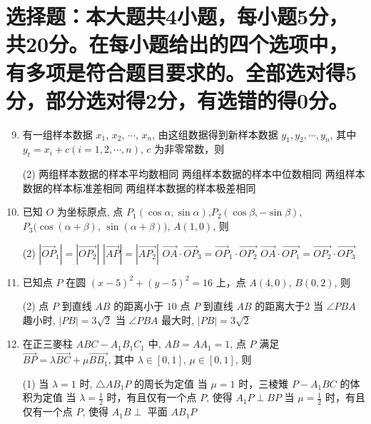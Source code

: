 \documentclass[11pt,space]{ctexart} %
\begin{document}
\begin{enumerate}[itemsep=0.3em,topsep=0pt]
\end{enumerate}

\section{选择题：本大题共4小题，每小题5分，共20分。在每小题给出的四个选项中，有多项是符合题目要求的。全部选对得5分，部分选对得2分，有选错的得0分。}


\begin{enumerate}[itemsep=0.3em,topsep=0pt]
	\setcounter{enumi}{8}

	\item    有一组样本数据 $ x_{1}$, $x_{2}$, $\cdots$, $x_{n} $, 由这组数据得到新样本数据  $y_{1}, y_{2}, \cdots, y_{n} $, 其中
	$y_{t}=x_{i}+c(i=1,2, \cdots, n)$, $c $ 为非零常数，则
	\begin{tasks}(2)
	\task  两组样本数据的样本平均数相同
	\task 两组样本数据的样本中位数相同
	\task 两组样本数据的样本标准差相同
	\task 两组样本数据的样本极差相同
	\end{tasks}

\newpage
   \item    已知 $ O $ 为坐标原点, 点 $ P_{1}(\cos \alpha, \sin \alpha)$,$ P_{2}(\cos \beta,-\sin \beta)$, $P_{3}(\cos (\alpha+\beta)$, $\sin (\alpha+\beta)) $,
	$A(1,0) $, 则

	\begin{tasks}(2)
	\task $ \left|\overrightarrow{O P}_{1}\right|=\left|\overrightarrow{O P_{2}}\right| $ \task $ |\overrightarrow{A P}|=\left|\overrightarrow{A P_{2}}\right| $
	\task $\overrightarrow{O A} \cdot \overrightarrow{O P}_{3}=\overrightarrow{O P}_{1} \cdot \overrightarrow{O P_{2}}  $
	\task $\overrightarrow{O A} \cdot \overrightarrow{O P_{1}}=\overrightarrow{O P_{2}} \cdot \overrightarrow{O P_{3}} $
	\end{tasks}

   \item    已知点 $ P $ 在圆 $ (x-5)^{2}+(y-5)^{2}=16 $ 上，点 $ A(4,0)$, $ B(0,2) $, 则
   \begin{tasks}(2)
   \task 点 $ P$  到直线  $A B $ 的距离小于 $10$
   \task 点 $ P $ 到直线 $ A B $ 的距离大于$2$
   \task 当 $ \angle P B A $ 趣小时, $ |P B|=3 \sqrt{2}$
   \task 当  $\angle P B A $ 最大时, $ |P B|=3 \sqrt{2}$
   \end{tasks}

   \item    在正三麥柱 $ A B C-A_{1} B_{1} C_{1} $ 中, $ A B=A A_{1}=1 $, 点 $ P $ 满足  $\overrightarrow{B P}=\lambda \overrightarrow{B C}+\mu \overrightarrow{B B_{1}} $, 其中
	$\lambda \in[0,1]$, $ \mu \in[0,1]$,   则

\begin{tasks}(1)
\task 当 $ \lambda=1$  时, $ \triangle A B_{1} P $ 的周长为定值
\task 当 $ \mu=1  $ 时，三棱雉 $ P-A_{1} B C $ 的体积为定值
\task 当 $ \lambda=\frac{1}{2} $ 时，有且仅有一个点 $ P $, 使得  $A_{1} P \perp B P$
\task 当 $ \mu=\frac{1}{2} $ 时，有且仅有一个点 $ P $, 使得 $ A_{1} B \perp$  平面 $ A B_{1} P$
\end{tasks}

\end{enumerate}
\end{document}
